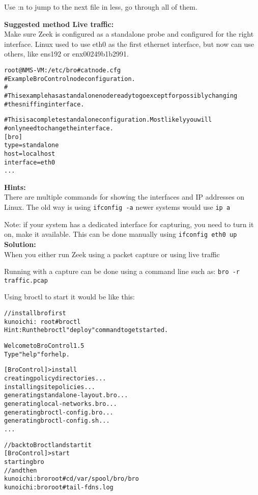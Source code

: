 \documentclass[a4paper,11pt,notitlepage]{report}
\begin{document}
Use :n to jump to the next file in less, go through all of them.

{\bf Suggested method Live traffic:}\\
Make sure Zeek is configured as a standalone probe and configured for the right interface. Linux used to use eth0 as the first ethernet interface, but now can use others, like ens192 or enx00249b1b2991.

\begin{alltt}
root@NMS-VM:/etc/bro# cat node.cfg
# Example BroControl node configuration.
#
# This example has a standalone node ready to go except for possibly changing
# the sniffing interface.

# This is a complete standalone configuration.  Most likely you will
# only need to change the interface.
[bro]
type=standalone
host=localhost
interface=eth0
...
\end{alltt}


{\bf Hints:}\\
There are multiple commands for showing the interfaces and IP addresses on Linux. The old way is using \verb+ifconfig -a+ newer systems would use \verb+ip a+

Note: if your system has a dedicated interface for capturing, you need to turn it on, make it available. This can be done manually using \verb+ifconfig eth0 up+
{\bf Solution:}\\
When you either run Zeek using a packet capture or using live traffic

Running with a capture can be done using a command line such as:
\verb+bro -r traffic.pcap+

Using broctl to start it would be like this:
\begin{alltt}\small
// install bro first
kunoichi:~ root# broctl
Hint: Run the broctl "deploy" command to get started.

Welcome to BroControl 1.5
Type "help" for help.

[BroControl] > install
creating policy directories ...
installing site policies ...
generating standalone-layout.bro ...
generating local-networks.bro ...
generating broctl-config.bro ...
generating broctl-config.sh ...
...
\end{alltt}

\begin{alltt}\small
// back to Broctl and start it
[BroControl] > start
starting bro
// and then
kunoichi:bro root# cd /var/spool/bro/bro
kunoichi:bro root# tail -f dns.log
\end{alltt}
\end{document}
